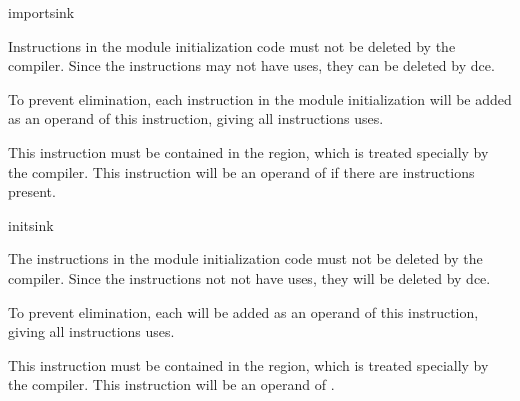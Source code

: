 \begin{instruction}{importsink}

  \begin{notes}
    Instructions in the module initialization code must not be deleted
    by the compiler.  Since the instructions may not have uses, they
    can be deleted by \ac{dce}.

    To prevent elimination, each instruction in the module
    initialization will be added as an operand of this instruction,
    giving all instructions uses.

    This instruction must be contained in the  region,
    which is treated specially by the compiler. This instruction will
    be an operand of  if there are 
    instructions present.
  \end{notes}

  \nresults

  \begin{operands}
  \item {}
  \end{operands}
\end{instruction}


\begin{instruction}{initsink}

  \begin{notes}
    The  instructions in the module initialization
    code must not be deleted by the compiler.  Since the instructions
    not not have uses, they will be deleted by \ac{dce}.

    To prevent elimination, each  will be added as an
    operand of this instruction, giving all 
    instructions uses.

    This instruction must be contained in the  region,
    which is treated specially by the compiler.  This instruction will
    be an operand of .
  \end{notes}

  \nresults

  \begin{operands}
  \item {}
  \end{operands}
\end{instruction}


